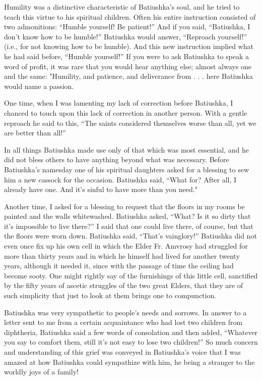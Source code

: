 Humility was a distinctive characteristic of Batiushka's soul, and he tried to teach this virtue to his spiritual children. Often his entire instruction consisted of two admonitions: “Humble yourself! Be patient!” And if you said, “Batiushka, I don't know how to be humble!” Batiushka would answer, “Reproach yourself!” (i.e., for not knowing how to be humble). And this new instruction implied what he had said before, “Humble yourself!” If you were to ask Batiushka to speak a word of profit, it was rare that you would hear anything else; almost always one and the same: "Humility, and patience, and deliverance from . . . here Batiushka would name a passion.

One time, when I was lamenting my lack of correction before Batiushka, I chanced to touch upon this lack of correction in another person. With a gentle reproach he said to this, “The saints considered themselves worse than all, yet we are better than all!”

In all things Batiushka made use only of that which was most essential, and he did not bless others to have anything beyond what was necessary. Before Batiushka's namesday one of his spiritual daughters asked for a blessing to sew him a new cassock for the occasion. Batiushka said, “What for? After all, I already have one. And it's sinful to have more than you need."

Another time, I asked for a blessing to request that the floors in my rooms be painted and the walls whitewashed. Batiushka asked, “What? Is it so dirty that it's impossible to live there?” I said that one could live there, of course, but that the floors were worn down. Batiushka said, “That’s vainglory!” Batiushka did not even once fix up his own cell in which the Elder Fr. Amvrosy had struggled for more than thirty years and in which he himself had lived for another twenty years, although it needed it, since with the passage of time the ceiling had become sooty. One might rightly say of the furnishings of this little cell, sanctified by the fifty years of ascetic struggles of the two great Elders, that they are of such simplicity that just to look at them brings one to compunction.

Batiushka was very sympathetic to people's needs and sorrows. In answer to a letter sent to me from a certain acquaintance who had lost two children from diphtheria, Batiushka said a few words of consolation and then added, “Whatever you say to comfort them, still it's not easy to lose two children!” So much concern and understanding of this grief was conveyed in Batiushka's voice that I was amazed at how Batiushka could sympathize with him, he being a stranger to the worldly joys of a family!

